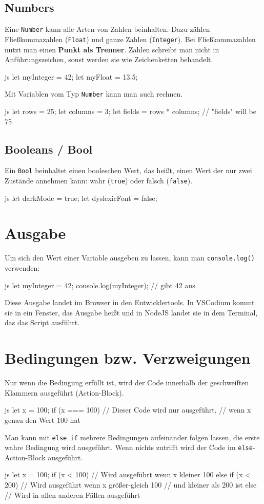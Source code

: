 \documentclass[10pt,a4paper]{article}
\begin{document}
\begin{multicols}{3}
\subsection*{Numbers}
Eine \texttt{Number} kann alle Arten von Zahlen beinhalten. Dazu zählen Fließkommazahlen (\texttt{Float}) und ganze Zahlen (\texttt{Integer}). Bei Fließkommazahlen nutzt man einen \textbf{Punkt als Trenner}. Zahlen schreibt man nicht in Anführungszeichen, sonst werden sie wie Zeichenketten behandelt.
\begin{codebox}{js}{}
  let myInteger = 42;
  let myFloat = 13.5;
\end{codebox}
Mit Variablen vom Typ \texttt{Number} kann man auch rechnen.
\begin{codebox}{js}{}
  let rows = 25;
  let columns = 3;
  let fields = rows * columns; // "fields" will be 75
\end{codebox}

\subsection*{Booleans / Bool}
Ein \texttt{Bool} beinhaltet einen booleschen Wert, das heißt, einen Wert der nur zwei Zustände annehmen kann: wahr (\texttt{true}) oder falsch (\texttt{false}).
\begin{codebox}{js}{}
  let darkMode = true;
  let dyslexicFont = false;
\end{codebox}


\section*{Ausgabe}
Um sich den Wert einer Variable ausgeben zu lassen, kann man \texttt{console.log()} verwenden:
\begin{codebox}{js}{}
let myInteger = 42;
console.log(myInteger); // gibt 42 aus
\end{codebox}
Diese Ausgabe landet im Browser in den Entwicklertools. In VSCodium kommt sie in ein Fenster, das Ausgabe heißt und in NodeJS landet sie in dem Terminal, das das Script ausführt.


\section*{Bedingungen bzw. Verzweigungen}
Nur wenn die Bedingung erfüllt ist, wird der Code innerhalb der geschweiften Klammern ausgeführt (Action-Block).
\begin{codebox}{js}{}
  let x = 100;
  if (x === 100) {
    // Dieser Code wird nur ausgeführt,
    // wenn x genau den Wert 100 hat
  }
\end{codebox}
Man kann mit \texttt{else if} mehrere Bedingungen aufeinander folgen lassen, die erste wahre Bedingung wird ausgeführt. Wenn nichts zutrifft wird der Code im \texttt{else}-Action-Block ausgeführt.
\begin{codebox}{js}{}
  let x = 100;
  if (x < 100) {
    // Wird ausgeführt wenn x kleiner 100
  } else if (x < 200) {
    // Wird ausgeführt wenn x größer-gleich 100
    // und kleiner als 200 ist
  } else {
    // Wird in allen anderen Fällen ausgeführt
  }
\end{codebox}



\end{multicols}
\end{document}

